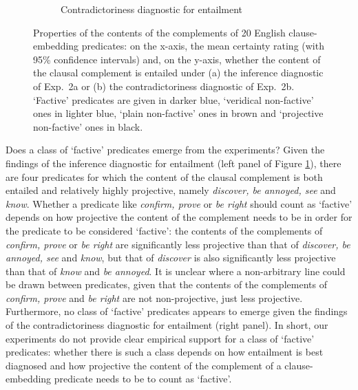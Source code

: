 \documentclass[11pt,fleqn]{article}
\newcommand{\6}{\mbox{$[\hspace*{-.6mm}[$}}
\newcommand{\9}{\mbox{$]\hspace*{-.6mm}]$}}
\begin{document}
{\begin{figure}[h]
\begin{subfigure}{.5\textwidth}
\caption{Contradictoriness diagnostic for entailment}
\end{subfigure}

\caption{Properties of the contents of the complements of 20 English clause-embedding predicates: on the x-axis, the mean certainty rating (with 95\% confidence intervals) and, on the y-axis, whether the content of the clausal complement is entailed under (a) the inference diagnostic of Exp.~2a or (b) the contradictoriness diagnostic of Exp.~2b. `Factive' predicates are given in darker blue, `veridical non-factive' ones in lighter blue, `plain non-factive' ones in brown and `projective non-factive' ones in black.}\label{f-summary-categorical}

\end{figure}

Does a class of `factive' predicates emerge from the experiments? Given the findings of the inference diagnostic for entailment (left panel of Figure \ref{f-summary-categorical}), there are four predicates for which the content of the clausal complement is both entailed and relatively highly projective, namely {\em discover, be annoyed, see} and {\em know}. Whether a predicate like {\em confirm, prove} or {\em be right} should count as `factive' depends on how projective the content of the complement needs to be in order for the predicate to be considered `factive': the contents of the complements of {\em confirm, prove} or {\em be right} are significantly less projective than that of {\em discover, be annoyed, see} and {\em know}, but that of {\em discover} is also significantly less projective than that of {\em know} and {\em be annoyed}. It is unclear where a non-arbitrary line could be drawn between predicates, given that the contents of the complements of {\em confirm, prove} and {\em be right} are not non-projective, just less projective. Furthermore, no class of `factive' predicates appears to emerge given the findings of the  contradictoriness diagnostic for entailment (right panel). In short, our experiments do not provide clear empirical support for a class of `factive' predicates: whether there is such a class depends on how entailment is best diagnosed and how projective the content of the complement of a clause-embedding predicate needs to be to count as `factive'.

}
\end{document}
